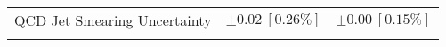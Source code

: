 \begin{table}
\begin{center}
\begin{tabular*}{\textwidth}{@{\extracolsep{\fill}}lcc}
QCD Jet Smearing Uncertainty        & $\pm 0.02\ [0.26\%] $          & $\pm 0.00\ [0.15\%] $       \\
\noalign{\smallskip}\hline\noalign{\smallskip}
\end{tabular*}


\end{center}
\end{table}

